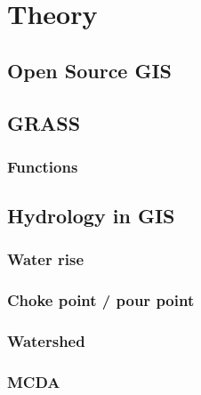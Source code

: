 
\chapter{Theory} %

\label{ch:theory} %




\section{Open Source GIS}


\section{GRASS}\label{sec:options}
\subsection*{Functions}



\section{Hydrology in GIS}\label{sec:custom}

\subsection*{Water rise}

\subsection*{Choke point / pour point}

\subsection*{Watershed}

\subsection*{MCDA}

